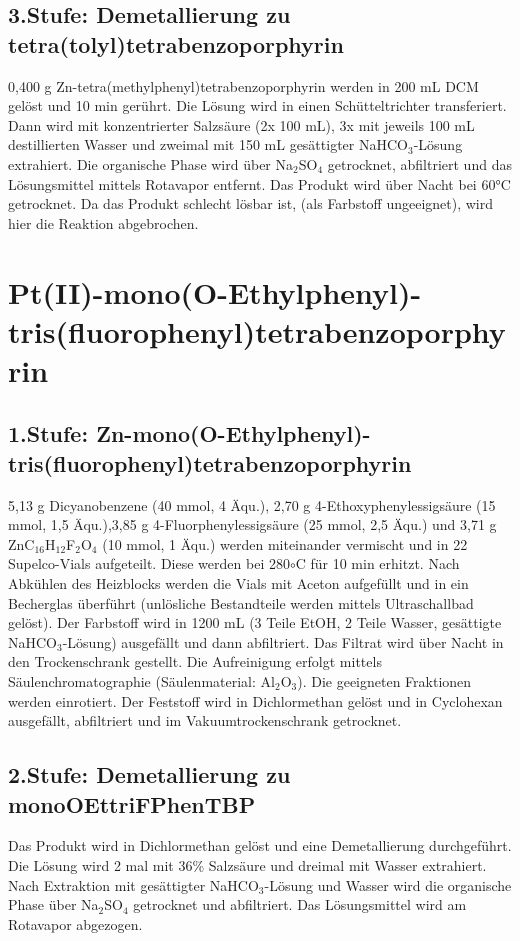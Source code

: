 \subsection{3.Stufe: Demetallierung zu tetra(tolyl)tetrabenzoporphyrin}
0,400 g Zn-tetra(methylphenyl)tetrabenzoporphyrin werden in 200 mL DCM gelöst und 10 min gerührt. Die Lösung wird in einen Schütteltrichter transferiert. Dann wird mit konzentrierter Salzsäure (2x 100 mL), 3x mit jeweils 100 mL destillierten Wasser und zweimal mit 150 mL gesättigter NaHCO$_3$-Lösung extrahiert. Die organische Phase wird über Na$_2$SO$_4$ getrocknet, abfiltriert und das Lösungsmittel mittels Rotavapor entfernt. Das Produkt wird über Nacht bei 60°C getrocknet. Da das Produkt  schlecht lösbar ist, (als Farbstoff ungeeignet), wird hier die Reaktion abgebrochen.

\section{Pt(II)-mono(O-Ethylphenyl)-tris(fluorophenyl)tetrabenzoporphyrin}
\subsection{1.Stufe: Zn-mono(O-Ethylphenyl)-tris(fluorophenyl)tetrabenzoporphyrin}
5,13 g Dicyanobenzene (40 mmol, 4 Äqu.), 2,70 g 4-Ethoxyphenylessigsäure (15 mmol, 1,5 Äqu.),3,85 g 4-Fluorphenylessigsäure (25 mmol, 2,5 Äqu.) und 3,71 g ZnC$_16$H$_12$F$_2$O$_4$ (10 mmol, 1 Äqu.) werden miteinander vermischt und in 22 Supelco-Vials aufgeteilt. Diese werden bei 280$\circ$C für 10 min erhitzt. Nach Abkühlen des Heizblocks werden die Vials mit Aceton aufgefüllt und in ein Becherglas überführt (unlösliche Bestandteile werden mittels Ultraschallbad gelöst). Der Farbstoff wird in 1200 mL (3 Teile EtOH, 2 Teile Wasser, gesättigte NaHCO$_3$-Lösung) ausgefällt und dann abfiltriert. Das Filtrat wird über Nacht in den Trockenschrank gestellt. Die Aufreinigung erfolgt mittels Säulenchromatographie (Säulenmaterial: Al$_2$O$_3$). Die geeigneten Fraktionen werden einrotiert. Der Feststoff wird in Dichlormethan gelöst und in Cyclohexan ausgefällt, abfiltriert und im Vakuumtrockenschrank getrocknet.


\subsection{2.Stufe: Demetallierung zu monoOEttriFPhenTBP}
Das Produkt wird in Dichlormethan gelöst und eine Demetallierung durchgeführt. Die Lösung wird 2 mal mit 36\% Salzsäure und dreimal mit Wasser extrahiert. Nach Extraktion mit gesättigter NaHCO$_3$-Lösung und Wasser wird die organische Phase über Na$_2$SO$_4$ getrocknet und abfiltriert. Das Lösungsmittel wird am Rotavapor abgezogen.

